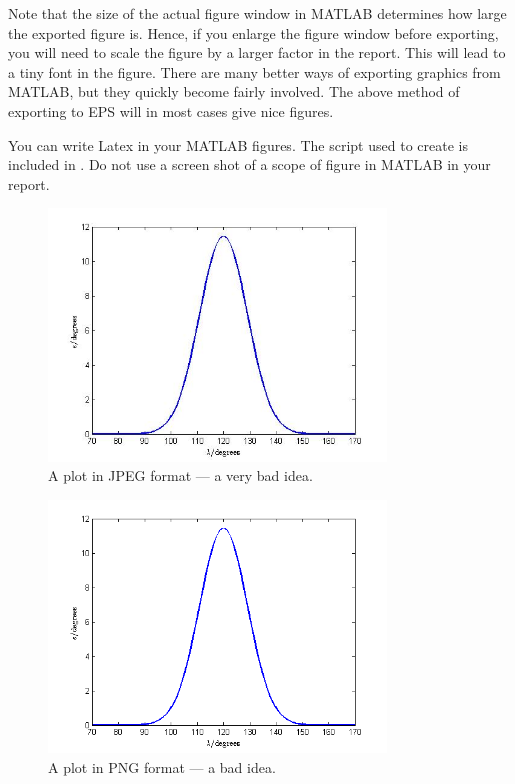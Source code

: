 Note that the size of the actual figure window in MATLAB determines how large the exported figure is. Hence, if you enlarge the figure window before exporting, you will need to scale the figure by a larger factor in the report. This will lead to a tiny font in the figure. There are many better ways of exporting graphics from MATLAB, but they quickly become fairly involved. The above method of exporting to EPS will in most cases give nice figures.

You can write Latex in your MATLAB figures. The script used to create  is included in . Do not use a screen shot of a scope of figure in MATLAB in your report.

\begin{figure}[htb]
	\centering
		\includegraphics[width=0.8\textwidth]{figures/template/constraint_jpg.jpg}
	\caption{A plot in JPEG format --- a very bad idea.}
\label{fig:constraint_jpg}
\end{figure}

\begin{figure}[htb]
	\centering
		\includegraphics[width=0.8\textwidth]{figures/template/constraint_png.png}
	\caption{A plot in PNG format --- a bad idea.}
\label{fig:constraint_png}
\end{figure}

